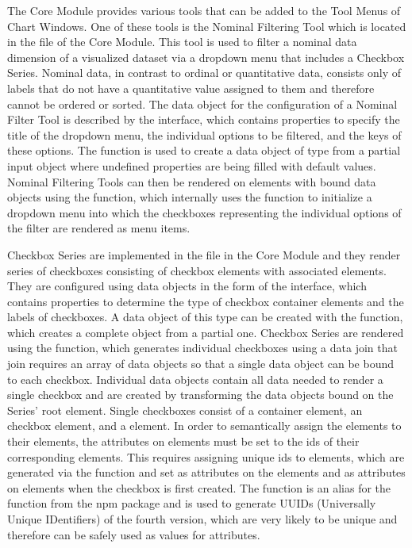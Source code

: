 The Core Module provides various tools that can be added to the Tool
Menus of Chart Windows.  One of these tools is the Nominal Filtering
Tool which is located in the  file
of the Core Module.  This tool is used to filter a nominal data
dimension of a visualized dataset via a dropdown menu that includes a
Checkbox Series.  Nominal data, in contrast to ordinal or quantitative
data, consists only of labels that do not have a quantitative value
assigned to them and therefore cannot be ordered or sorted.  The data
object for the configuration of a Nominal Filter Tool is described by
the  interface, which contains properties to
specify the title of the dropdown menu, the individual options to be
filtered, and the keys of these options.  The
 function is used to create a data object
of type  from a partial input object where
undefined properties are being filled with default values.  Nominal
Filtering Tools can then be rendered on elements with bound
 data objects using the
 function, which internally uses the
 function to initialize a dropdown menu into
which the checkboxes representing the individual options of the filter
are rendered as menu items.

Checkbox Series are implemented in the  file
in the Core Module and they render series of checkboxes consisting of
checkbox  elements with associated 
elements.  They are configured using data objects in the form of the
 interface, which contains properties to
determine the type of checkbox container elements and the labels of
checkboxes.  A data object of this type can be created with the
 function, which creates a complete object
from a partial one.  Checkbox Series are rendered using the
 function, which generates individual
checkboxes using a data join that join requires an array of
 data objects so that a single data object can be bound
to each checkbox.  Individual  data objects contain all
data needed to render a single checkbox and are created by
transforming the  data objects bound on the
Series' root element.  Single checkboxes consist of a container
element, an  checkbox element, and a 
element.  In order to semantically assign the  elements
to their  elements, the  attributes on
 elements must be set to the ids of their corresponding
 elements.  This requires assigning unique ids to
 elements, which are generated via the 
function and set as  attributes on the 
elements and as  attributes on  elements when
the checkbox is first created.  The  function is an alias
for the  function from the  npm package
\parencite{UUIDPackage} and is used to generate UUIDs (Universally
Unique IDentifiers) \parencite{UUIDRFC} of the fourth version, which
are very likely to be unique and therefore can be safely used as
values for  attributes.

